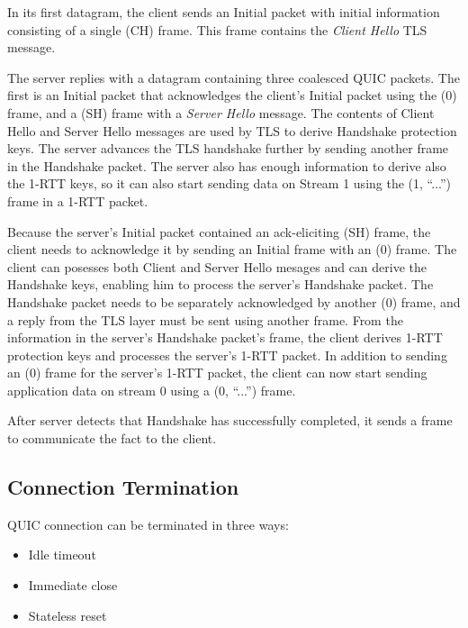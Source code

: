 In its first datagram, the client sends an Initial packet with initial information consisting of a
single \CRYPTO{}(CH) frame. This frame contains the \textit{Client Hello} TLS message.

The server replies with a datagram containing three coalesced QUIC packets. The first is an Initial
packet that acknowledges the client's Initial packet using the \ACK{}(0) frame, and a \CRYPTO{}(SH)
frame with a \textit{Server Hello} message. The contents of Client Hello and Server Hello messages
are used by TLS to derive Handshake protection keys. The server advances the TLS handshake further
by sending another \CRYPTO{} frame in the Handshake packet. The server also has enough information
to derive also the 1-RTT keys, so it can also start sending data on Stream 1 using the \STREAM{}(1,
``...'') frame in a 1-RTT packet.

Because the server's Initial packet contained an ack-eliciting \CRYPTO{}(SH) frame, the client needs
to acknowledge it by sending an Initial frame with an \ACK{}(0) frame. The client can posesses both
Client and Server Hello mesages and can derive the Handshake keys, enabling him to process the
server's Handshake packet. The Handshake packet needs to be separately acknowledged by another
\ACK{}(0) frame, and a reply from the TLS layer must be sent using another \CRYPTO{} frame. From the
information in the server's Handshake packet's \CRYPTO{} frame, the client derives 1-RTT protection
keys and processes the server's 1-RTT packet. In addition to sending an \ACK{}(0) frame for the
server's 1-RTT packet, the client can now start sending application data on stream 0 using a
\STREAM{}(0, ``...'') frame.

After server detects that Handshake has successfully completed, it sends a \HANDSHAKEDONE{} frame to
communicate the fact to the client.


\subsection{Connection Termination}

QUIC connection can be terminated in three ways:

\begin{itemize}

  \item Idle timeout

  \item Immediate close

  \item Stateless reset

\end{itemize}

